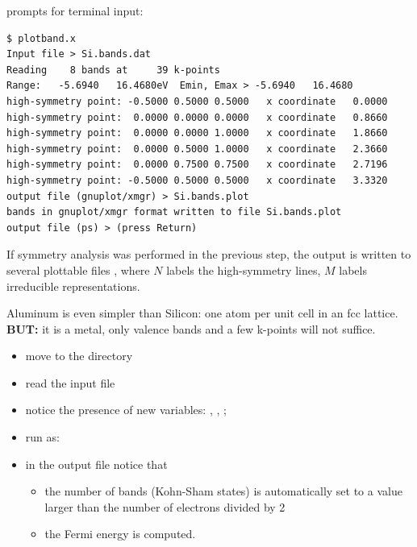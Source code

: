 \documentclass[landscape]{foils}
\begin{document}
 prompts for terminal input:
{\codecolor
\begin{verbatim}
$ plotband.x 
Input file > Si.bands.dat
Reading    8 bands at     39 k-points
Range:   -5.6940   16.4680eV  Emin, Emax > -5.6940   16.4680
high-symmetry point: -0.5000 0.5000 0.5000   x coordinate   0.0000
high-symmetry point:  0.0000 0.0000 0.0000   x coordinate   0.8660
high-symmetry point:  0.0000 0.0000 1.0000   x coordinate   1.8660
high-symmetry point:  0.0000 0.5000 1.0000   x coordinate   2.3660
high-symmetry point:  0.0000 0.7500 0.7500   x coordinate   2.7196
high-symmetry point: -0.5000 0.5000 0.5000   x coordinate   3.3320
output file (gnuplot/xmgr) > Si.bands.plot   
bands in gnuplot/xmgr format written to file Si.bands.plot
output file (ps) > (press Return)
\end{verbatim}
}
%
If symmetry analysis was performed in the previous step, the output is
written to several plottable files ,
where $N$ labels the high-symmetry lines,
$M$ labels irreducible representations.


%
Aluminum is even simpler than Silicon: one atom per unit cell
in an fcc lattice.\\
{\bf\burgundy BUT:} it is a metal, only valence bands and a few k-points will
not suffice.
\begin{itemize}
\item move to the  directory
\item read the  input file 
\item notice the presence of new variables: ,
, ;
\item run  as:\\[0.5em]
\item in the output file notice that
  \begin{itemize}
  \item the number of bands (Kohn-Sham states)
    is automatically set to a value larger than the number of
    electrons divided by 2
  \item the Fermi energy is computed.
  \end{itemize}
\end{itemize}
\end{document}
